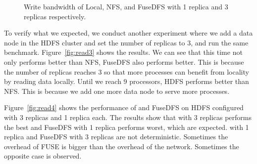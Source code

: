 \begin{figure}[t]
\begin{center}
\caption{\small Write bandwidth of Local, NFS, {\proj} and FuseDFS
with 1 replica and 3 replicas respectively.}
\label{fig:write}
\vspace{-6pt}
\end{center}
\end{figure}

To verify what we expected, we conduct another experiment where we add a data
node in the HDFS cluster and set the
number of replicas to 3, and run the same benchmark. Figure~\ref{fig:read3}
shows the results. We can see that this time not only {\proj} performs better
than NFS, FuseDFS also performs better. This is because the number of replicas
reaches 3 so that more processes can benefit from locality by reading data
locally. Until we reach 9 processors, HDFS
performs better than NFS. This is because we add one more data node to
serve more processes.


Figure~\ref{fig:read4} shows the performance of {\proj} and FuseDFS on HDFS
configured with 3 replicas and 1 replica each. The results show that {\proj}
with 3 replicas performs the best and FuseDFS with 1 replica performs worst,
which are expected. {\proj} with 1 replica and FuseDFS with 3 replicas are not
deterministic. Sometimes the overhead of FUSE is bigger than the overhead of the
network. Sometimes the opposite case is observed. 

